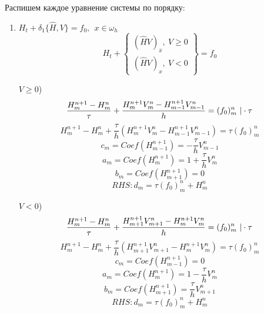 \documentclass[12pt]{article}
\begin{document}
Распишем каждое уравнение системы по порядку:
\begin{enumerate}
    \item $H_t + \delta_1\{\hat H, V\} = f_0, \ \ x \in \omega_h$
    \begin{equation}
    H_t +
        \left\{
            \begin{array}{l}
                (\hat{H}V)_{\bar{x}}, \ V \geq 0 \\
                (\hat{H}V)_x, \ V < 0
            \end{array}
        \right\}
    = f_0
    \end{equation}
    
    $V \geq 0$) $$
    \displaystyle \frac{H^{n+1}_{m} - H^n_m}{\tau} + \frac{H^{n+1}_mV^n_m - H^{n+1}_{m-1}V^n_{m-1}}{h} = (f_0)^n_m \ | \cdot \tau \\ $$
    $$
    H^{n+1}_{m} - H^n_m + \frac{\tau}{h} (H^{n+1}_mV^n_m - H^{n+1}_{m-1}V^n_{m-1}) = \tau (f_0)^n_m
    $$
    \begin{equation}
        \displaystyle c_m = Coef (H^{n+1}_{m-1}) = - \frac{\tau}{h}V^n_{m-1}
    \end{equation}
    \begin{equation}
        \displaystyle a_m = Coef (H^{n+1}_{m}) = 1 + \frac{\tau}{h}V^n_{m}
    \end{equation}
    \begin{equation}
        \displaystyle b_m = Coef (H^{n+1}_{m+1}) = 0
    \end{equation}
    \begin{equation}
        \displaystyle RHS : d_m = \tau (f_0)^n_m + H^n_m
    \end{equation}

    $V < 0$) $$
    \displaystyle \frac{H^{n+1}_{m} - H^n_m}{\tau} + \frac{H^{n+1}_{m+1}V^n_{m+1} - H^{n+1}_{m}V^n_{m}}{h} = (f_0)^n_m \ | \cdot \tau \\ $$
    $$
    H^{n+1}_{m} - H^n_m + \frac{\tau}{h} (H^{n+1}_{m+1}V^n_{m+1} - H^{n+1}_{m}V^n_{m}) = \tau (f_0)^n_m
    $$
    \begin{equation}
        \displaystyle c_m = Coef (H^{n+1}_{m-1}) = 0
    \end{equation}
    \begin{equation}
        \displaystyle a_m = Coef (H^{n+1}_{m}) = 1 - \frac{\tau}{h}V^n_{m}
    \end{equation}
    \begin{equation}
        \displaystyle b_m = Coef (H^{n+1}_{m+1}) = \frac{\tau}{h}V^n_{m+1}
    \end{equation}
    \begin{equation}
        \displaystyle RHS : d_m = \tau (f_0)^n_m + H^n_m
    \end{equation}
    

\end{enumerate}
\end{document}
